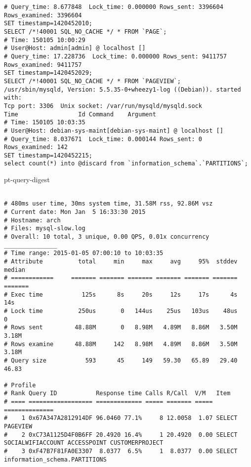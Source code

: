 \begin{appendix}
\begin{footnotesize}
\begin{verbatim}
# Query_time: 8.677848  Lock_time: 0.000000 Rows_sent: 3396604  Rows_examined: 3396604
SET timestamp=1420452010;
SELECT /*!40001 SQL_NO_CACHE */ * FROM `PAGE`;
# Time: 150105 10:00:29
# User@Host: admin[admin] @ localhost []
# Query_time: 17.228736  Lock_time: 0.000000 Rows_sent: 9411757  Rows_examined: 9411757
SET timestamp=1420452029;
SELECT /*!40001 SQL_NO_CACHE */ * FROM `PAGEVIEW`;
/usr/sbin/mysqld, Version: 5.5.35-0+wheezy1-log ((Debian)). started with:
Tcp port: 3306  Unix socket: /var/run/mysqld/mysqld.sock
Time                 Id Command    Argument
# Time: 150105 10:03:35
# User@Host: debian-sys-maint[debian-sys-maint] @ localhost []
# Query_time: 8.037671  Lock_time: 0.000144 Rows_sent: 0  Rows_examined: 142
SET timestamp=1420452215;
select count(*) into @discard from `information_schema`.`PARTITIONS`;
\end{verbatim}

pt-query-digest
\begin{verbatim}

# 480ms user time, 30ms system time, 31.58M rss, 92.86M vsz
# Current date: Mon Jan  5 16:33:30 2015
# Hostname: arch
# Files: mysql-slow.log
# Overall: 10 total, 3 unique, 0.00 QPS, 0.01x concurrency _______________
# Time range: 2015-01-05 07:00:10 to 10:03:35
# Attribute          total     min     max     avg     95%  stddev  median
# ============     ======= ======= ======= ======= ======= ======= =======
# Exec time           125s      8s     20s     12s     17s      4s     14s
# Lock time          250us       0   144us    25us   103us    48us       0
# Rows sent         48.88M       0   8.98M   4.89M   8.86M   3.50M   3.18M
# Rows examine      48.88M     142   8.98M   4.89M   8.86M   3.50M   3.18M
# Query size           593      45     149   59.30   65.89   29.40   46.83

# Profile
# Rank Query ID           Response time Calls R/Call  V/M   Item
# ==== ================== ============= ===== ======= ===== ==============
#    1 0x67A347A2812914DF 96.0460 77.1%     8 12.0058  1.07 SELECT PAGEVIEW
#    2 0xC73A1125D4F0B6FF 20.4920 16.4%     1 20.4920  0.00 SELECT SOCIALWIFIACCOUNT ACCESSPOINT CUSTOMERPROJECT
#    3 0xF47B7F81FA0E3307  8.0377  6.5%     1  8.0377  0.00 SELECT information_schema.PARTITIONS


\end{verbatim}
\end{footnotesize}
\end{appendix}
